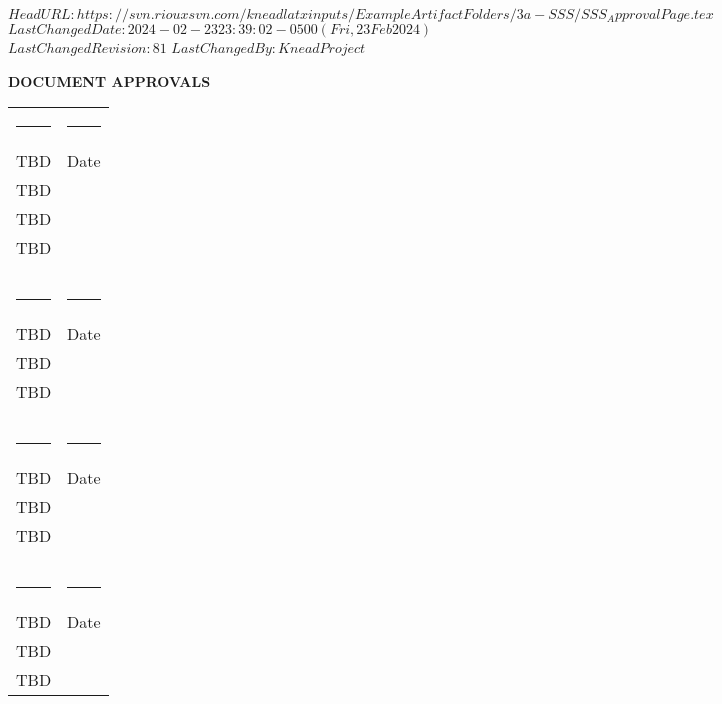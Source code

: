 \svnidlong
{$HeadURL: https://svn.riouxsvn.com/kneadlatxinputs/ExampleArtifactFolders/3a-SSS/SSS_ApprovalPage.tex $}
{$LastChangedDate: 2024-02-23 23:39:02 -0500 (Fri, 23 Feb 2024) $}
{$LastChangedRevision: 81 $}
{$LastChangedBy: KneadProject $}


\begin{center}
\singlespace
   {\bfseries DOCUMENT APPROVALS}
		\vfill
\begin{tabular}{lc}
\rule[-0.075in]{3.5in}{0.5pt}  & \rule[-0.075in]{2.0in}{0.5pt}\\
TBD         &  Date\\	
TBD & \\
TBD & \\
TBD & \\ 
& \\%
& \\%
& \\%
\rule[-0.075in]{3.5in}{0.5pt}  & \rule[-0.075in]{2.0in}{0.5pt}\\
TBD         &  Date\\	
TBD & \\
TBD & \\
& \\%
& \\%
& \\%
\rule[-0.075in]{3.5in}{0.5pt}  & \rule[-0.075in]{2.0in}{0.5pt}\\
TBD         &  Date\\	
TBD & \\
TBD & \\
& \\%
& \\%
& \\%
\rule[-0.075in]{3.5in}{0.5pt}  & \rule[-0.075in]{2.0in}{0.5pt}\\
TBD         &  Date\\	
TBD & \\
TBD & \\													
\end{tabular}
\vfill
\end{center}

